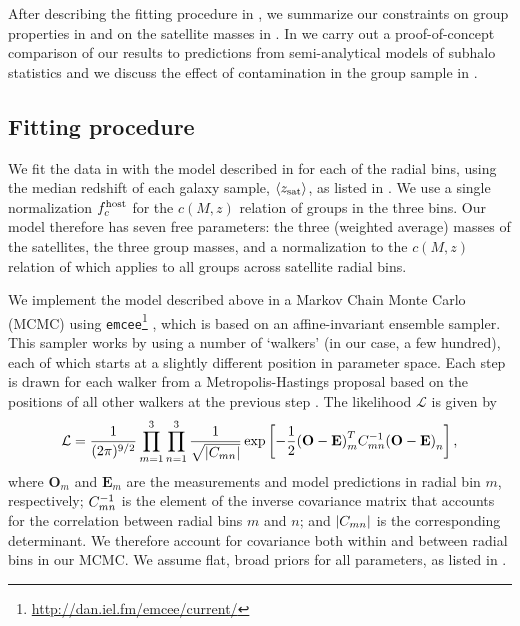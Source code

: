 After describing the fitting procedure in , we summarize our constraints on group 
properties in  and on the satellite masses in . In 
 we carry out a proof-of-concept comparison of our results to predictions from 
semi-analytical models of subhalo statistics and we discuss the effect of contamination in the 
group sample in .

\subsection{Fitting procedure}\label{s:fitting}

We fit the data in  with the model described in  for each of 
the radial bins, using the median redshift of each galaxy sample, $\langle z_{\rm sat} \rangle$, 
as listed in . We use a single normalization $f_c^{\rm host}$ for the $c(M,z)$ 
relation of groups in the three bins. Our model therefore has seven free parameters: the three 
(weighted average) masses of the satellites, the three group masses, and a normalization to the 
$c(M,z)$ relation of \cite{duffy08} which applies to all groups across satellite radial bins.

We implement the model described above in a Markov Chain Monte Carlo (MCMC) using 
\texttt{emcee}\footnote{\url{http://dan.iel.fm/emcee/current/}} \citep{foreman13}, which is based 
on an affine-invariant ensemble sampler. This sampler works by using a number of `walkers' (in our 
case, a few hundred), each of which starts at a slightly different position in parameter space. 
Each step is drawn for each walker from a Metropolis-Hastings proposal based on the positions of 
all other walkers at the previous step \citep[see][for details about the algorithm]{goodman10}. The 
likelihood $\mathcal{L}$ is given by
\begin{equation}\label{eq:likelihood}
 \mathcal{L} = 
 \frac1{(2\pi)^{9/2}} \prod_{m=1}^3\prod_{n=1}^3 \frac1{\sqrt{\lvert C_{mn} \rvert}}
 \exp\left[-\frac1{2}\mathbf{(O-E)}^T_mC^{-1}_{mn}\mathbf{(O-E)}_n\right],
\end{equation}
where $\mathbf{O}_m$ and $\mathbf{E}_m$ are the measurements and model predictions in 
radial bin $m$, respectively; $C^{-1}_{mn}$ is the element of the inverse covariance 
matrix that accounts for the correlation between radial bins $m$ and $n$; and 
$\lvert C_{mn}\rvert$ is the corresponding determinant. We therefore account for 
covariance both within and between radial bins in our MCMC. We assume flat, broad priors for all 
parameters, as listed in .

